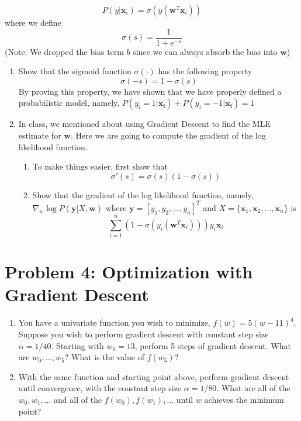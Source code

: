 \documentclass[a4paper]{article}
\begin{document}
	$$P(y|\mathbf{x}_i) = \sigma(y(\mathbf{w}^T\mathbf{x}_i))$$ where we define 	
	$$\sigma(s) = \frac{1}{1 + e^{-s}}$$
	(Note: We dropped the bias term $b$ since we can always absorb the bias into $\mathbf{w}$)
	\begin{enumerate}
		\item Show that the sigmoid function $\sigma(\cdot)$ has the following property $$\sigma(-s) = 1 - \sigma(s)$$ By proving this property, we have shown that we have properly defined a probabilistic model, namely, $P(y_i = 1| \mathbf{x_i}) + P(y_i = -1| \mathbf{x_i}) = 1$  
		\item In class, we mentioned about using Gradient Descent to find the MLE estimate for $\mathbf{w}$. Here we are going to compute the gradient of the log likelihood function.
		\begin{enumerate}
			\item To make things easier, first show that $$\sigma'(s) = \sigma(s) (1-\sigma(s))$$
			\item Show that the  gradient of the log likelihood function, namely, $\nabla_w \log P(\mathbf{y} | X, \mathbf{w})$ where $\mathbf{y} = [y_1, y_2, ..., y_n]^T$ and $X = \{\mathbf{x}_1,\mathbf{x}_2 ,...,\mathbf{x}_n \}$ is 
				$$\sum_{i = 1}^{n} (1 - \sigma(y_i(\mathbf{w}^T\mathbf{x}_i)))y_i \mathbf{x}_i$$
		\end{enumerate}
	\end{enumerate}

\section*{Problem 4: Optimization with Gradient Descent}
\begin{enumerate}
	\item You have a univariate function you wish to minimize, $f(w)=5(w-11)^4$. Suppose you wish to perform gradient descent with constant step size $\alpha=1/40$. Starting with $w_0=13$, perform 5 steps of gradient descent. What are $w_0,...,w_5$? What is the value of $f(w_5)$?
	\item With the same function and starting point above, perform gradient descent until convergence, with the constant step size $\alpha=1/80$. What are all of the $w_0,w_1,...$ and all of the $f(w_0),f(w_1),...$ until $w$ achieves the minimum point?
\end{enumerate}
\end{document}
